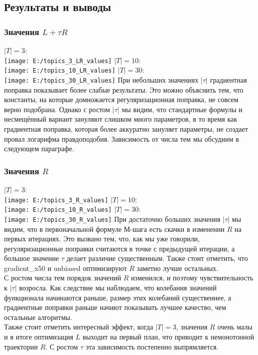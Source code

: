 \documentclass[12pt]{article}
\begin{document}
\subsection{Результаты и выводы}
\subsubsection{Значения $L + \tau R$}
$|T| = 3$:\\
\texttt{[image: E:/topics\_3\_LR\_values]}
\newpage
$|T| = 10$:\\
\texttt{[image: E:/topics\_10\_LR\_values]}
$|T| = 30$:\\
\texttt{[image: E:/topics\_30\_LR\_values]}
При небольших значениях $|\tau|$ градиентная поправка показывает более слабые результаты. Это можно объяснить тем, что константы, на которые домножается регуляризационная поправка,  не совсем верно подобрана. Однако с ростом $|\tau|$ мы видим, что стандартные формулы и несмещённый вариант зануляют слишком много параметров, в то время как градиентная поправка, которая более аккуратно зануляет параметры, не создает провал логарифма правдоподобия. Зависимость от числа тем мы обсудиим в следующем параграфе.
\subsubsection{Значения $R$}
$|T| = 3$:\\
\texttt{[image: E:/topics\_3\_R\_values]}
$|T| = 10$:\\
\texttt{[image: E:/topics\_10\_R\_values]}
\newpage
$|T| = 30$:\\
\texttt{[image: E:/topics\_30\_R\_values]}
При достаточно больших значения $|\tau|$ мы видим, что в первоначальной формуле М-шага есть скачки в изменении $R$ на первых итерациях. Это вызвано тем, что, как мы уже говорили, регуляризационные поправки считаются в точке с предыдущей итерации, а большое значение $\tau$ делает различие существенным. Также стоит отметить, что gradient\_x50 и unbiased оптимизируют $R$ заметно лучше остальных.\\
С ростом числа тем порядок значений $R$ изменился, и поэтому чувствительность к $|\tau|$ возросла. Как следствие мы наблюдаем, что колебания значений функционала начинаются раньше, размер этих колебаний существеннее, а градиентные поправки раньше начиют показывать лучшее качество, чем остальные алгоритмы.\\
Также стоит отметить интересный эффект, когда $|T| = 3$, значения $R$ очень малы и в итоге оптимизация $L$ выходит на первый план, что приводит к немонотонной траектории $R$. С ростом $\tau$ эта зависимость постепенно выпрямляется.
\end{document}
